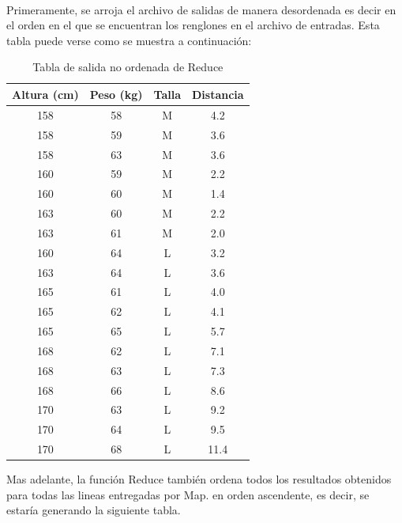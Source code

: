 \\
Primeramente, se arroja el archivo de salidas de manera desordenada es decir en el orden en el que se encuentran los renglones en el archivo de entradas. Esta tabla puede verse como se muestra a continuación:
\begin{table}[H]
		\begin{center}
			\label{tab:tablaKNNDistancias3}
			\begin{tabular}{c|c|c|c}
				\textbf{Altura (cm)} & \textbf{Peso (kg)} & \textbf{Talla} & \textbf{Distancia}\\
				\hline
				158 & 58 & M & 4.2\\
				158 & 59 & M & 3.6\\
				158 & 63 & M & 3.6\\
				160 & 59 & M & 2.2\\
				160 & 60 & M & 1.4\\
				163 & 60 & M & 2.2\\
				163 & 61 & M & 2.0\\
				160 & 64 & L & 3.2\\
				163 & 64 & L & 3.6\\
				165 & 61 & L & 4.0\\
				165 & 62 & L & 4.1\\
				165 & 65 & L & 5.7\\
				168 & 62 & L & 7.1\\
				168 & 63 & L & 7.3\\
				168 & 66 & L & 8.6\\
				170 & 63 & L & 9.2\\
				170 & 64 & L & 9.5\\
				170 & 68 & L & 11.4\\
			\end{tabular}
		\end{center}
		\caption{Tabla de salida no ordenada de Reduce}
	\end{table}
Mas adelante, la función Reduce también ordena todos los resultados obtenidos para todas las lineas entregadas por Map. en orden ascendente, es decir, se estaría generando la siguiente tabla.
